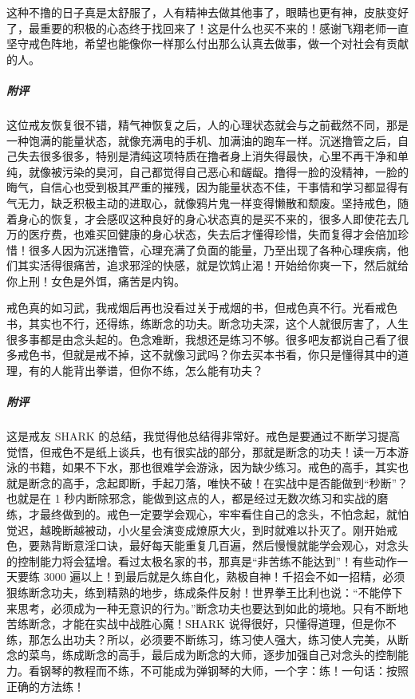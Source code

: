 \begin{case}
    这种不撸的日子真是太舒服了，人有精神去做其他事了，眼睛也更有神，皮肤变好了，最重要的积极的心态终于找回来了！这是什么也买不来的！感谢飞翔老师一直坚守戒色阵地，希望也能像你一样那么付出那么认真去做事，做一个对社会有贡献的人。
    \subparagraph{附评} 这位戒友恢复很不错，精气神恢复之后，人的心理状态就会与之前截然不同，那是一种饱满的能量状态，就像充满电的手机、加满油的跑车一样。沉迷撸管之后，自己失去很多很多，特别是清纯这项特质在撸者身上消失得最快，心里不再干净和单纯，就像被污染的臭河，自己都觉得自己恶心和龌龊。撸得一脸的没精神，一脸的晦气，自信心也受到极其严重的摧残，因为能量状态不佳，干事情和学习都显得有气无力，缺乏积极主动的进取心，就像鸦片鬼一样变得懒散和颓废。坚持戒色，随着身心的恢复，才会感叹这种良好的身心状态真的是买不来的，很多人即使花去几万的医疗费，也难买回健康的身心状态，失去后才懂得珍惜，失而复得才会倍加珍惜！很多人因为沉迷撸管，心理充满了负面的能量，乃至出现了各种心理疾病，他们其实活得很痛苦，追求邪淫的快感，就是饮鸩止渴！开始给你爽一下，然后就给你上刑！女色是外饵，痛苦是内钩。
\end{case}

\begin{case}
    戒色真的如习武，我戒烟后再也没看过关于戒烟的书，但戒色真不行。光看戒色书，其实也不行，还得练，练断念的功夫。断念功夫深，这个人就很厉害了，人生很多事都是由念头起的。色念难断，我想还是练习不够。很多吧友都说自己看了很多戒色书，但就是戒不掉，这不就像习武吗？你去买本书看，你只是懂得其中的道理，有的人能背出拳谱，但你不练，怎么能有功夫？
    \subparagraph{附评} 这是戒友 SHARK 的总结，我觉得他总结得非常好。戒色是要通过不断学习提高觉悟，但戒色不是纸上谈兵，也有很实战的部分，那就是断念的功夫！读一万本游泳的书籍，如果不下水，那也很难学会游泳，因为缺少练习。戒色的高手，其实也就是断念的高手，念起即断，手起刀落，唯快不破！在实战中是否能做到“秒断”？也就是在 1 秒内断除邪念，能做到这点的人，都是经过无数次练习和实战的磨练，才最终做到的。戒色一定要学会观心，牢牢看住自己的念头，不怕念起，就怕觉迟，越晚断越被动，小火星会演变成燎原大火，到时就难以扑灭了。刚开始戒色，要熟背断意淫口诀，最好每天能重复几百遍，然后慢慢就能学会观心，对念头的控制能力将会猛增。看过太极名家的书，那真是“非苦练不能达到”！有些动作一天要练 3000 遍以上！到最后就是久练自化，熟极自神！千招会不如一招精，必须狠练断念功夫，练到精熟的地步，练成条件反射！世界拳王比利也说：“不能停下来思考，必须成为一种无意识的行为。”断念功夫也要达到如此的境地。只有不断地苦练断念，才能在实战中战胜心魔！SHARK 说得很好，只懂得道理，但是你不练，那怎么出功夫？所以，必须要不断练习，练习使人强大，练习使人完美，从断念的菜鸟，练成断念的高手，最后成为断念的大师，逐步加强自己对念头的控制能力。看钢琴的教程而不练，不可能成为弹钢琴的大师，一个字：练！一句话：按照正确的方法练！
\end{case}

